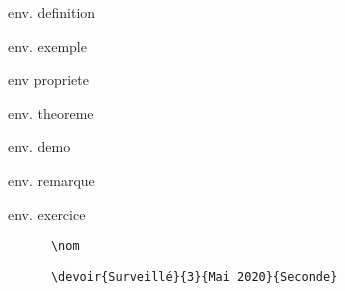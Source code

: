 \documentclass{article}
\begin{document}
  \begin{minipage}{1.0\linewidth}
    \begin{definition}
      env. definition
    \end{definition}

    \begin{exemple}
      env. exemple
    \end{exemple}

    \begin{propriete}
      env propriete
    \end{propriete}

    \begin{theoreme}
      env. theoreme
    \end{theoreme}
    
    \begin{demo}
      env. demo
    \end{demo}

    \begin{remarque}
      env. remarque
    \end{remarque}

    \begin{exercice}
      env. exercice
    \end{exercice}

    \begin{Verbatim}
      \nom
    \end{Verbatim}
    \begin{minipage}{1.0\linewidth}
      \nom
    \end{minipage}

    \begin{Verbatim}
      \devoir{Surveillé}{3}{Mai 2020}{Seconde}
    \end{Verbatim}
    \begin{minipage}{1.0\linewidth}
    \end{minipage}
  \end{minipage}
\end{document}
